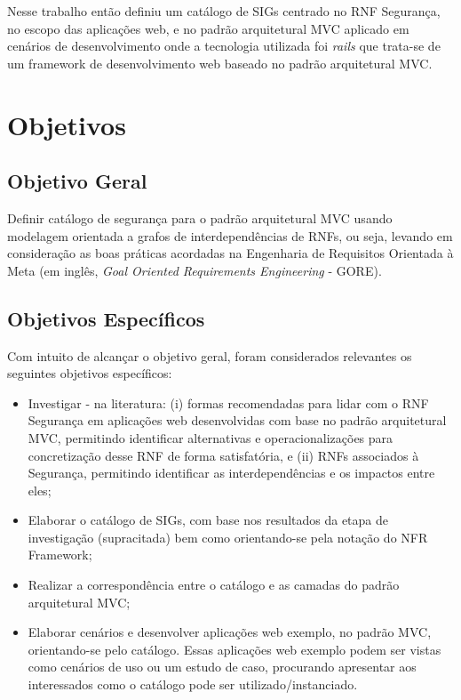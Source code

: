 Nesse trabalho então definiu um catálogo de SIGs centrado no RNF Segurança, no escopo das aplicações web, e no padrão arquitetural MVC aplicado em cenários de desenvolvimento onde a tecnologia utilizada foi \textit{rails} que trata-se de um framework de desenvolvimento web baseado no padrão arquitetural MVC. 

\section{Objetivos}
 
\subsection{Objetivo Geral}

Definir catálogo de segurança para o padrão arquitetural MVC usando modelagem orientada a grafos de interdependências de RNFs, ou seja, levando em consideração as boas práticas acordadas na Engenharia de Requisitos Orientada à Meta (em inglês, \textit{Goal Oriented Requirements Engineering} - GORE). 

\subsection{Objetivos Específicos}

Com intuito de alcançar o objetivo geral, foram considerados relevantes os seguintes objetivos específicos:

\begin{itemize}
	
	\item Investigar - na literatura: (i) formas recomendadas para lidar com o RNF Segurança em aplicações web desenvolvidas com base no padrão arquitetural MVC, permitindo identificar alternativas e operacionalizações para concretização desse RNF de forma satisfatória, e (ii) RNFs associados à Segurança, permitindo identificar as interdependências e os impactos entre eles;
	
	\item Elaborar o catálogo de SIGs, com base nos resultados da etapa de investigação (supracitada) bem como orientando-se pela notação do NFR Framework;
	
	\item Realizar a correspondência entre o  catálogo e as camadas do padrão arquitetural MVC;
	
	
	\item Elaborar cenários e desenvolver aplicações web exemplo, no padrão MVC, orientando-se pelo catálogo. Essas aplicações web exemplo podem ser vistas como cenários de uso ou um estudo de caso, procurando apresentar aos interessados como o catálogo pode ser utilizado/instanciado. 
	
\end{itemize}

